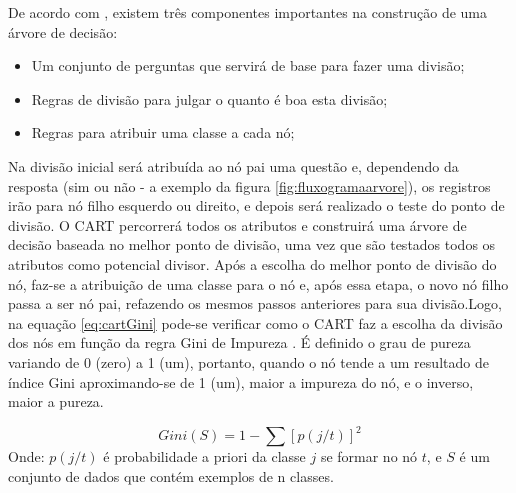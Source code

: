 De acordo com \cite{yohannes1999classification,Raimundo2008}, existem três componentes importantes na construção de uma árvore de decisão:

\begin{itemize}
[noitemsep]
 \item Um conjunto de perguntas que servirá de base para fazer uma divisão;
 \item Regras de divisão para julgar o quanto é boa esta divisão;
 \item Regras para atribuir uma classe a cada nó;
\end{itemize}

Na divisão inicial será atribuída ao nó pai uma questão e,  dependendo da resposta (sim ou não - a exemplo da figura \ref{fig:fluxogramaarvore}), os registros irão para nó filho esquerdo ou direito, e depois será realizado o teste do ponto de divisão. O CART percorrerá todos os atributos e construirá uma árvore de decisão baseada no melhor ponto de divisão, uma vez que são testados todos os atributos como potencial divisor. Após a escolha do melhor ponto de divisão do nó, faz-se a atribuição de uma classe para o nó e, após essa etapa, o novo nó filho passa a ser nó pai, refazendo os mesmos passos anteriores para sua divisão.Logo, na equação \ref{eq:cartGini} pode-se verificar como o CART faz a escolha da divisão dos nós em função da regra Gini de Impureza \cite{breiman1984}. É definido o grau de pureza variando de 0 (zero) a 1 (um), portanto, quando o nó tende a um resultado de índice Gini aproximando-se de 1 (um), maior a impureza do nó, e o inverso, maior a pureza. 

\begin{equation}
Gini(S)= 1 - \sum [p(j/t)]^2
 \label{eq:cartGini}
\end{equation}
Onde: ${p(j/t)}$ é probabilidade a priori da classe ${j}$ se formar no nó ${t}$, e ${S}$ é um conjunto de dados que contém exemplos de n classes.

